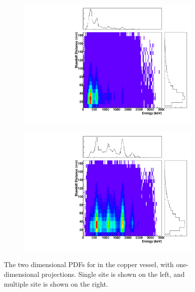\documentclass[herrin-thesis.tex]{subfiles}
\begin{document}
\begin{figure}[hp]
\centering
	\begin{subfigure}[b]{0.48\textwidth}
	\centering
	\includegraphics[width=\textwidth]{./plots/PDFs/analysis_pdf_AllVessel_U238_ss.pdf}
\end{subfigure}\hfill%
\begin{subfigure}[b]{0.48\textwidth}
	\centering
	\includegraphics[width=1\textwidth]{./plots/PDFs/analysis_pdf_AllVessel_U238_ms.pdf}
	\end{subfigure}
\caption[PDF for  in the TPC vessel]{The two dimensional PDFs for  in the copper vessel, with one-dimensional projections. Single site is shown on the left, and multiple site is shown on the right.}
\label{fig:analysis_pdf_AllVessel_U238}
\end{figure}
\end{document}
